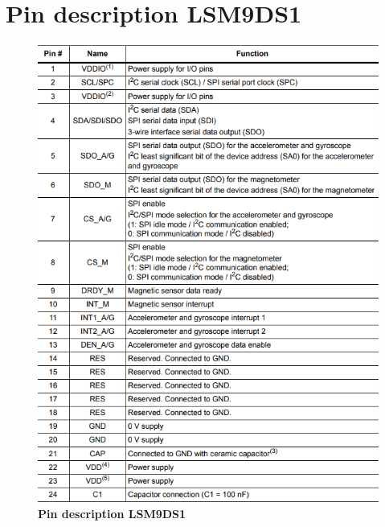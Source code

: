 \section{Pin description LSM9DS1}
\begin{figure}[h!]
	\centering	\includegraphics[width=14cm]{Images/imupin1}
	\caption{\textbf{Pin description LSM9DS1}} 
\end{figure}

